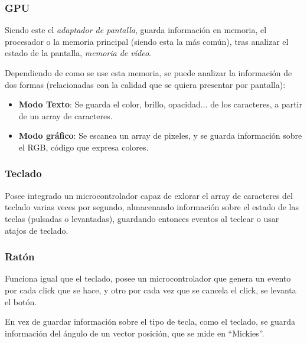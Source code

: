 \subsubsection{GPU}
Siendo este el \textit{adaptador de pantalla}, guarda información en memoria, el procesador o la memoria principal (siendo esta la más común), tras analizar el estado de la pantalla, \textit{memoria de vídeo}.\par  Dependiendo de como se use esta memoria, se puede analizar la información de dos formas (relacionadas con la calidad que se quiera presentar por pantalla):
\begin{itemize}
        \item \textbf{Modo Texto}: Se guarda el color, brillo, opacidad... de los caracteres, a partir de un array de caracteres.
        \item \textbf{Modo gráfico}: Se escanea un array de pixeles, y se guarda información sobre el RGB, código que expresa colores.
\end{itemize}
\subsubsection{Teclado}
Posee integrado un microcontrolador capaz de exlorar el array de caracteres del teclado varias veces por segundo, almacenando información sobre el estado de las teclas (pulsadas o levantadas), guardando entonces eventos al teclear o usar atajos de teclado.
\subsubsection{Ratón}
Funciona igual que el teclado, posee un microcontrolador que genera un evento por cada click que se hace, y otro por cada vez que se cancela el click, se levanta el botón. \par  En vez de guardar información sobre el tipo de tecla, como el teclado, se guarda información del ángulo de un vector posición, que se mide en ``Mickies''.
